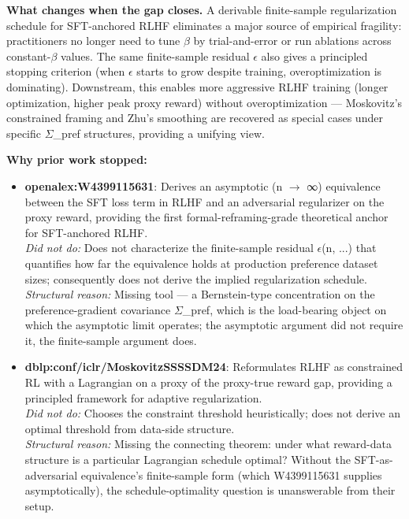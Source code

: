 \documentclass[10pt,a4paper]{article}
\begin{document}
\begin{tcolorbox}[colback=bgskill, colframe=cblue, title=\textbf{NoveltySkill — Idea Card (L3 Oral-Ready)}, breakable]
\textbf{What changes when the gap closes.} A derivable finite-sample regularization schedule for SFT-anchored RLHF eliminates a major source of empirical fragility: practitioners no longer need to tune $\beta$ by trial-and-error or run ablations across constant-$\beta$ values. The same finite-sample residual $\epsilon$ also gives a principled stopping criterion (when $\epsilon$ starts to grow despite training, overoptimization is dominating). Downstream, this enables more aggressive RLHF training (longer optimization, higher peak proxy reward) without overoptimization --- Moskovitz's constrained framing and Zhu's smoothing are recovered as special cases under specific $\Sigma$\_pref structures, providing a unifying view.

\textbf{Why prior work stopped:}
\begin{itemize}[leftmargin=*]
  \item \textbf{openalex:W4399115631}: Derives an asymptotic (n $\to$ ∞) equivalence between the SFT loss term in RLHF and an adversarial regularizer on the proxy reward, providing the first formal-reframing-grade theoretical anchor for SFT-anchored RLHF. \\ \emph{Did not do:} Does not characterize the finite-sample residual $\epsilon$(n, ...) that quantifies how far the equivalence holds at production preference dataset sizes; consequently does not derive the implied regularization schedule. \\ \emph{Structural reason:} Missing tool --- a Bernstein-type concentration on the preference-gradient covariance $\Sigma$\_pref, which is the load-bearing object on which the asymptotic limit operates; the asymptotic argument did not require it, the finite-sample argument does.
  \item \textbf{dblp:conf/iclr/MoskovitzSSSSDM24}: Reformulates RLHF as constrained RL with a Lagrangian on a proxy of the proxy-true reward gap, providing a principled framework for adaptive regularization. \\ \emph{Did not do:} Chooses the constraint threshold heuristically; does not derive an optimal threshold from data-side structure. \\ \emph{Structural reason:} Missing the connecting theorem: under what reward-data structure is a particular Lagrangian schedule optimal? Without the SFT-as-adversarial equivalence's finite-sample form (which W4399115631 supplies asymptotically), the schedule-optimality question is unanswerable from their setup.

\end{itemize}
\end{tcolorbox}
\end{document}

